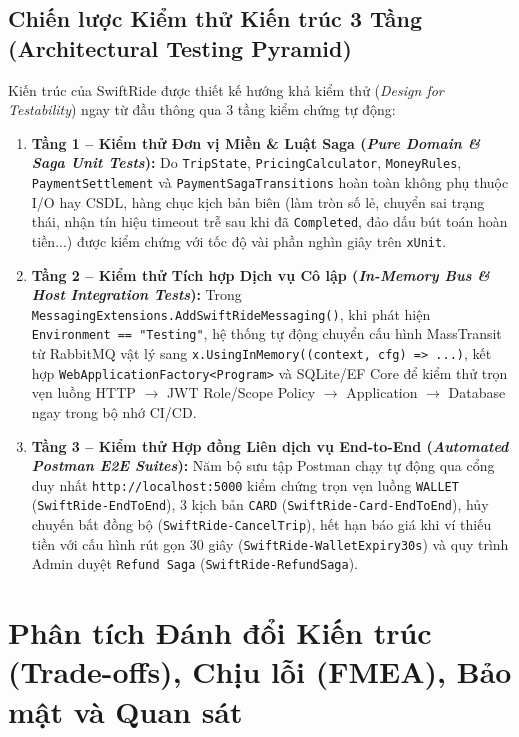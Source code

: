 \documentclass[12pt,a4paper]{article}
\begin{document}
\subsection{Chiến lược Kiểm thử Kiến trúc 3 Tầng (Architectural Testing Pyramid)}
Kiến trúc của SwiftRide được thiết kế hướng khả kiểm thử (\textit{Design for Testability}) ngay từ đầu thông qua 3 tầng kiểm chứng tự động:
\begin{enumerate}[leftmargin=1.5em]
    \item \textbf{Tầng 1 -- Kiểm thử Đơn vị Miền \& Luật Saga (\textit{Pure Domain \& Saga Unit Tests}):} Do \texttt{TripState}, \texttt{PricingCalculator}, \texttt{MoneyRules}, \texttt{PaymentSettlement} và \texttt{PaymentSagaTransitions} hoàn toàn không phụ thuộc I/O hay CSDL, hàng chục kịch bản biên (làm tròn số lẻ, chuyển sai trạng thái, nhận tín hiệu timeout trễ sau khi đã \texttt{Completed}, đảo dấu bút toán hoàn tiền...) được kiểm chứng với tốc độ vài phần nghìn giây trên \texttt{xUnit}.
    \item \textbf{Tầng 2 -- Kiểm thử Tích hợp Dịch vụ Cô lập (\textit{In-Memory Bus \& Host Integration Tests}):} Trong \texttt{MessagingExtensions.AddSwiftRideMessaging()}, khi phát hiện \texttt{Environment == "Testing"}, hệ thống tự động chuyển cấu hình MassTransit từ RabbitMQ vật lý sang \texttt{x.UsingInMemory((context, cfg) => ...)}, kết hợp \texttt{WebApplicationFactory<Program>} và SQLite/EF Core để kiểm thử trọn vẹn luồng HTTP $\rightarrow$ JWT Role/Scope Policy $\rightarrow$ Application $\rightarrow$ Database ngay trong bộ nhớ CI/CD.
    \item \textbf{Tầng 3 -- Kiểm thử Hợp đồng Liên dịch vụ End-to-End (\textit{Automated Postman E2E Suites}):} Năm bộ sưu tập Postman chạy tự động qua cổng duy nhất \texttt{http://localhost:5000} kiểm chứng trọn vẹn luồng \texttt{WALLET} (\texttt{SwiftRide-EndToEnd}), 3 kịch bản \texttt{CARD} (\texttt{SwiftRide-Card-EndToEnd}), hủy chuyến bất đồng bộ (\texttt{SwiftRide-CancelTrip}), hết hạn báo giá khi ví thiếu tiền với cấu hình rút gọn 30 giây (\texttt{SwiftRide-WalletExpiry30s}) và quy trình Admin duyệt \texttt{Refund Saga} (\texttt{SwiftRide-RefundSaga}).
\end{enumerate}

\section{Phân tích Đánh đổi Kiến trúc (Trade-offs), Chịu lỗi (FMEA), Bảo mật và Quan sát}
\end{document}

